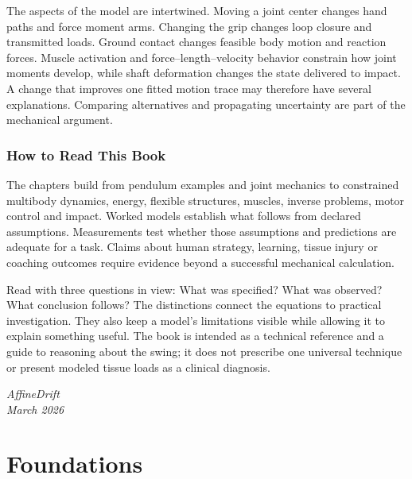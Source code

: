 \documentclass[10pt,letterpaper,openany]{book}
\theoremstyle{plain}
\begin{document}
The aspects of the model are intertwined. Moving a joint center changes hand paths and force moment arms. Changing the grip changes loop closure and transmitted loads. Ground contact changes feasible body motion and reaction forces. Muscle activation and force--length--velocity behavior constrain how joint moments develop, while shaft deformation changes the state delivered to impact. A change that improves one fitted motion trace may therefore have several explanations. Comparing alternatives and propagating uncertainty are part of the mechanical argument.

\section*{How to Read This Book}\label{reader-guidance}

The chapters build from pendulum examples and joint mechanics to constrained multibody dynamics, energy, flexible structures, muscles, inverse problems, motor control and impact. Worked models establish what follows from declared assumptions. Measurements test whether those assumptions and predictions are adequate for a task. Claims about human strategy, learning, tissue injury or coaching outcomes require evidence beyond a successful mechanical calculation.

Read with three questions in view: What was specified? What was observed? What conclusion follows? The distinctions connect the equations to practical investigation. They also keep a model's limitations visible while allowing it to explain something useful. The book is intended as a technical reference and a guide to reasoning about the swing; it does not prescribe one universal technique or present modeled tissue loads as a clinical diagnosis.

\vspace{1cm}
\noindent\textit{AffineDrift}\\
\textit{March 2026}

\cleardoublepage



\tableofcontents
\cleardoublepage

\listoffigures
\cleardoublepage

\mainmatter

\part{Foundations}



\end{document}
